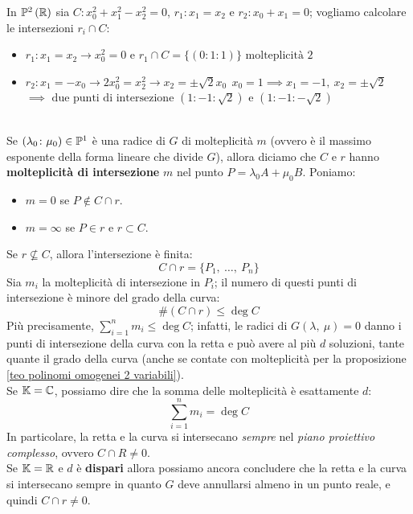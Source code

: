 \begin{example}
	In $\proj[2]{\realset}$ sia $C\colon x_0^2+x_1^2-x_2^2=0$, $r_1\colon x_1=x_2$ e $r_2\colon x_0+x_1=0$; vogliamo calcolare le intersezioni $r_i\cap C$:
	\begin{itemize}
		\item $r_1\colon x_1=x_2 \rightarrow x_0^2=0 \text{ e } r_1\cap C=\{ (0\colon 1 \colon 1) \} \text{ molteplicità 2}$
		\item $r_2 \colon x_1=-x_0 \rightarrow 2x_0^2=x_2^2 \rightarrow x_2=\pm \sqrt{2}x_0 \ \ x_0=1\implies x_1=-1,\ x_2=\pm \sqrt{2}$\\
			$\implies \text{ due punti di intersezione } (1\colon -1\colon \sqrt{2}) \text{ e } (1\colon -1\colon -\sqrt{2})$
	\end{itemize}
\end{example}
\begin{define}~{}\\
	Se $(\lambda_0\colon\mu_0)\in\proj[1]{\ }$ è una radice di $G$ di molteplicità $m$ (ovvero è il massimo esponente della forma lineare che divide $G$), allora diciamo che $C$ e $r$ hanno \textbf{molteplicità di intersezione} $m$ nel punto $P=\lambda_0 A+\mu_0 B$. Poniamo:
	\begin{itemize}
		\item $m=0$ se $P\notin C\cap r$.
		\item $m=\infty$ se $P\in r$ e $r\subset C$.
	\end{itemize}
\end{define}
\begin{observe}
	Se $r\nsubseteq C$, allora l'intersezione è finita:
	\begin{equation*}
		C\cap r=\{P_1,\ \ldots,\ P_n\}
	\end{equation*}
	Sia $m_i$ la molteplicità di intersezione in $P_i$; il numero di questi punti di intersezione è minore del grado della curva:
		\begin{equation}
			\# (C\cap r)\leq \deg C
		\end{equation}
	Più precisamente, $\displaystyle \sum_{i=1}^n m_i\leq\deg C$; infatti, le radici di $G\left(\lambda,\ \mu\right)=0$ danno i punti di intersezione della curva con la retta e può avere al più $d$ soluzioni, tante quante il grado della curva (anche se contate con molteplicità per la proposizione \ref{teo polinomi omogenei 2 variabili}).\\
	Se $\mathbb{K}=\mathbb{C}$, possiamo dire che la somma delle molteplicità è esattamente $d$:
	\begin{equation}
		\displaystyle \sum_{i=1}^n m_i=\deg C
	\end{equation}
	In particolare, la retta e la curva si intersecano \textit{sempre} nel \textit{piano proiettivo complesso}, ovvero $C\cap R\neq 0$.\\
	Se $\mathbb{K}=\mathbb{R}$ e $d$ è \textbf{dispari} allora possiamo ancora concludere che la retta e la curva si intersecano sempre in quanto $G$ deve annullarsi almeno in un punto reale, e quindi $C\cap r\neq 0$.
\end{observe}
